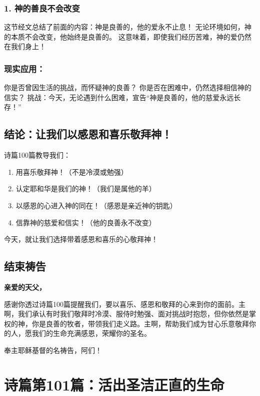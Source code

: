 \documentclass[a4paper, 12pt]{article}
\begin{document}
\subsubsection*{1. 神的善良不会改变}
这节经文总结了前面的内容：神是良善的，他的爱永不止息！
无论环境如何，神的本质不会改变，他始终是良善的。
这意味着，即使我们经历苦难，神的爱仍然在我们身上！
\subsubsection*{现实应用：}

你是否曾因生活的挑战，而怀疑神的良善？
你是否在困难中，仍然选择相信神的信实？
挑战：今天，无论遇到什么困难，宣告“神是良善的，他的慈爱永远长存！”

\subsection*{结论：让我们以感恩和喜乐敬拜神！}
诗篇100篇教导我们：
\begin{enumerate}
    \item 用喜乐敬拜神！（不是冷漠或勉强）

    \item 认定耶和华是我们的神！（我们是属他的羊）

    \item 以感恩的心进入神的同在！（感恩是亲近神的钥匙）

    \item 信靠神的慈爱和信实！（他的良善永不改变）

\end{enumerate}

今天，就让我们选择带着感恩和喜乐的心敬拜神！

\subsection*{结束祷告}
\textbf{亲爱的天父，}

感谢你透过诗篇100篇提醒我们，要以喜乐、感恩和敬拜的心来到你的面前。主啊，我们承认有时我们敬拜时冷漠、服侍时勉强、面对挑战时抱怨，但你依然是掌权的神，你是良善的牧者，带领我们走义路。主啊，帮助我们成为甘心乐意敬拜你的人，愿我们的生命充满感恩，荣耀你的圣名。

奉主耶稣基督的名祷告，阿们！
\newpage
\section{诗篇第101篇：活出圣洁正直的生命}
\end{document}
